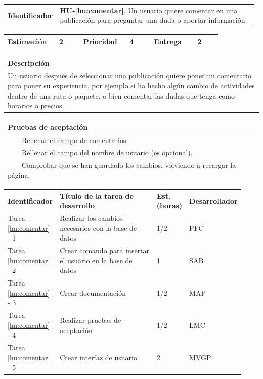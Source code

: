\documentclass[11pt]{article}
\newcommand{\tabitem}{~~\llap{\textbullet}~~}
\begin{document}
\begin{longtable}{p{0.18\linewidth}|p{0.8\linewidth}}
  \rowcolor{LightCyan}
  \textbf{Identificador} & \textbf{HU-\ref{hu:comentar}}. Un usuario quiere comentar en una publicación para preguntar una duda o aportar información \\  
\end{longtable}
\vspace{-0.8cm}
\begin{longtable}{p{0.18\linewidth}|p{0.1\linewidth}|p{0.18\linewidth}|p{0.1\linewidth}|p{0.18\linewidth}|p{0.1\linewidth}}
  \toprule
  \textbf{Estimación} & 2 & \textbf{Prioridad} & 4 & \textbf{Entrega} & 2 \\
  \bottomrule
\end{longtable}
\vspace{-0.8cm}
\begin{longtable}{p{1.028\linewidth}}
  \textbf{Descripción}\\
  \midrule
  Un usuario después de seleccionar una publicación quiere poner un comentario para poner su experiencia, por ejemplo si ha hecho algún cambio de actividades dentro de una ruta o paquete, o bien comentar las dudas que tenga como horarios o precios. \\
  \bottomrule
\end{longtable}
\vspace{-0.8cm}
\begin{longtable}{p{1.028\linewidth}}
  \textbf{Pruebas de aceptación}\\
  \midrule
  \tabitem Rellenar el campo de comentarios.\\
  \tabitem Rellenar el campo del nombre de usuario (es opcional).\\
  \tabitem Comprobar que se han guardado los cambios, volviendo a recargar la página.\\
\end{longtable}
\vspace{-0.8cm}
\begin{longtable}{p{0.18\linewidth}|p{0.48\linewidth}|p{0.1\linewidth}|p{0.17\linewidth}}
  \toprule
  \textbf{Identificador} & \textbf{Título de la tarea de desarrollo} & \textbf{Est. (horas)} & \textbf{Desarrollador} \\
  Tarea \ref{hu:comentar} - 1 & Realizar los cambios necesarios con la base de datos & 1/2 &PFC\\
  Tarea \ref{hu:comentar} - 2 & Crear comando para insertar el usuario en la base de datos & 1 & SAB\\
  Tarea \ref{hu:comentar} - 3 & Crear documentación & 1/2 & MAP\\
  Tarea \ref{hu:comentar} - 4 & Realizar pruebas de aceptación & 1/2 &  LMC\\
  Tarea \ref{hu:comentar} - 5 & Crear interfaz de usuario & 2 &  MVGP\\
  \bottomrule
\end{longtable}
\end{document}
